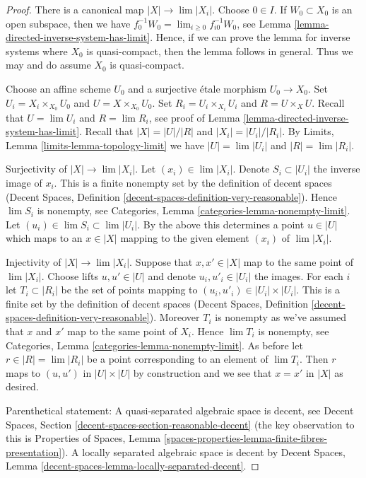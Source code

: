 \begin{proof}
There is a canonical map $|X| \to \lim |X_i|$. Choose $0 \in I$.
If $W_0 \subset X_0$ is an open subspace, then we have
$f_0^{-1}W_0 = \lim_{i \geq 0} f_{i0}^{-1}W_0$, see
Lemma \ref{lemma-directed-inverse-system-has-limit}.
Hence, if we can prove the lemma for inverse systems where $X_0$
is quasi-compact, then the lemma follows in general. Thus we may and do
assume $X_0$ is quasi-compact.

\medskip\noindent
Choose an affine scheme $U_0$ and a surjective \'etale morphism $U_0 \to X_0$.
Set $U_i = X_i \times_{X_0} U_0$ and $U = X \times_{X_0} U_0$.
Set $R_i = U_i \times_{X_i} U_i$ and $R = U \times_X U$.
Recall that $U = \lim U_i$ and $R = \lim R_i$, see proof of
Lemma \ref{lemma-directed-inverse-system-has-limit}.
Recall that $|X| = |U|/|R|$ and $|X_i| = |U_i|/|R_i|$. By
Limits, Lemma \ref{limits-lemma-topology-limit} we have
$|U| = \lim |U_i|$ and $|R| = \lim |R_i|$.

\medskip\noindent
Surjectivity of $|X| \to \lim |X_i|$. Let $(x_i) \in \lim |X_i|$. Denote
$S_i \subset |U_i|$ the inverse image of $x_i$. This is a finite nonempty
set by the definition of decent spaces
(Decent Spaces, Definition \ref{decent-spaces-definition-very-reasonable}).
Hence $\lim S_i$ is nonempty, see
Categories, Lemma \ref{categories-lemma-nonempty-limit}.
Let $(u_i) \in \lim S_i \subset \lim |U_i|$. By the above this determines
a point $u \in |U|$ which maps to an $x \in |X|$ mapping to the given
element $(x_i)$ of $\lim |X_i|$.

\medskip\noindent
Injectivity of $|X| \to \lim |X_i|$. Suppose that $x, x' \in |X|$
map to the same point of $\lim |X_i|$. Choose lifts $u, u' \in |U|$
and denote $u_i, u'_i \in |U_i|$ the images.
For each $i$ let $T_i \subset |R_i|$ be the set of points mapping
to $(u_i, u'_i) \in |U_i| \times |U_i|$. This is a finite
set by the definition of decent spaces
(Decent Spaces, Definition \ref{decent-spaces-definition-very-reasonable}).
Moreover $T_i$ is nonempty as we've assumed that $x$ and $x'$ map to the
same point of $X_i$. Hence $\lim T_i$ is nonempty, see
Categories, Lemma \ref{categories-lemma-nonempty-limit}.
As before let $r \in |R| = \lim |R_i|$ be a point corresponding to an
element of $\lim T_i$. Then $r$ maps to $(u, u')$ in $|U| \times |U|$
by construction and we see that $x = x'$ in $|X|$ as desired.

\medskip\noindent
Parenthetical statement: A quasi-separated algebraic space is decent, see
Decent Spaces, Section \ref{decent-spaces-section-reasonable-decent}
(the key observation to this is Properties of Spaces, Lemma
\ref{spaces-properties-lemma-finite-fibres-presentation}).
A locally separated algebraic space is decent by
Decent Spaces, Lemma \ref{decent-spaces-lemma-locally-separated-decent}.
\end{proof}

